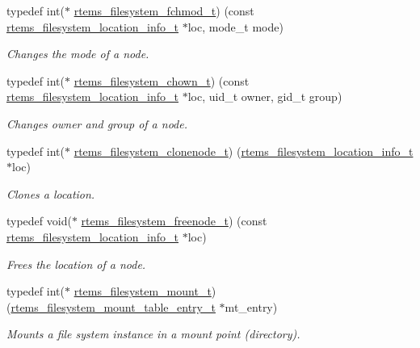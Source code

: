 \begin{DoxyCompactItemize}
typedef int($\ast$ \mbox{\hyperlink{group__LibIOFSOps_ga1b1d7f7442b24fc05ffedc596f1cec4b}{rtems\+\_\+filesystem\+\_\+fchmod\+\_\+t}}) (const \mbox{\hyperlink{group__LibIO_ga3252b3d31ee3c49ffff0b7604a676864}{rtems\+\_\+filesystem\+\_\+location\+\_\+info\+\_\+t}} $\ast$loc, mode\+\_\+t mode)
\begin{DoxyCompactList}\small\item\em Changes the mode of a node. \end{DoxyCompactList}\item 
typedef int($\ast$ \mbox{\hyperlink{group__LibIOFSOps_gad7040c3142badcd374418462276f977a}{rtems\+\_\+filesystem\+\_\+chown\+\_\+t}}) (const \mbox{\hyperlink{group__LibIO_ga3252b3d31ee3c49ffff0b7604a676864}{rtems\+\_\+filesystem\+\_\+location\+\_\+info\+\_\+t}} $\ast$loc, uid\+\_\+t owner, gid\+\_\+t group)
\begin{DoxyCompactList}\small\item\em Changes owner and group of a node. \end{DoxyCompactList}\item 
typedef int($\ast$ \mbox{\hyperlink{group__LibIOFSOps_ga7ff510a002e57b7165b331e4c2f21a10}{rtems\+\_\+filesystem\+\_\+clonenode\+\_\+t}}) (\mbox{\hyperlink{group__LibIO_ga3252b3d31ee3c49ffff0b7604a676864}{rtems\+\_\+filesystem\+\_\+location\+\_\+info\+\_\+t}} $\ast$loc)
\begin{DoxyCompactList}\small\item\em Clones a location. \end{DoxyCompactList}\item 
typedef void($\ast$ \mbox{\hyperlink{group__LibIOFSOps_gae151461f446627c1bee2a12decf99745}{rtems\+\_\+filesystem\+\_\+freenode\+\_\+t}}) (const \mbox{\hyperlink{group__LibIO_ga3252b3d31ee3c49ffff0b7604a676864}{rtems\+\_\+filesystem\+\_\+location\+\_\+info\+\_\+t}} $\ast$loc)
\begin{DoxyCompactList}\small\item\em Frees the location of a node. \end{DoxyCompactList}\item 
typedef int($\ast$ \mbox{\hyperlink{group__LibIOFSOps_ga1836d0f226aaaf7d7a94231dadb42663}{rtems\+\_\+filesystem\+\_\+mount\+\_\+t}}) (\mbox{\hyperlink{structrtems__filesystem__mount__table__entry__tt}{rtems\+\_\+filesystem\+\_\+mount\+\_\+table\+\_\+entry\+\_\+t}} $\ast$mt\+\_\+entry)
\begin{DoxyCompactList}\small\item\em Mounts a file system instance in a mount point (directory). \end{DoxyCompactList}\item 

\end{DoxyCompactItemize}
